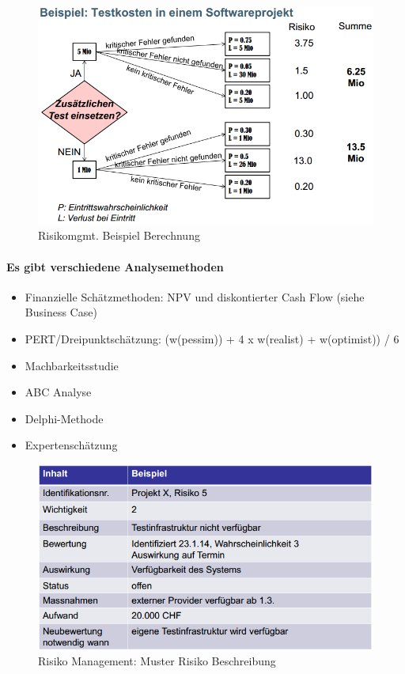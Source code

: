 \begin{figure}[h!]
\centering
\includegraphics[width=0.7\linewidth]{fig/risiko-management-beispiel-berechnung}
\caption{Risikomgmt. Beispiel Berechnung}
\label{fig:risiko-management-beispiel-berechnung}
\end{figure}

\paragraph{Es gibt verschiedene Analysemethoden}
\begin{itemize}
	\item Finanzielle Schätzmethoden: NPV und diskontierter Cash Flow (siehe Business Case)
	\item PERT/Dreipunktschätzung: (w(pessim)) + 4 x w(realist) + w(optimist)) / 6
	\item Machbarkeitsstudie
	\item ABC Analyse
	\item Delphi-Methode
	\item Expertenschätzung
\end{itemize}

\begin{figure}[h!]
\centering
\includegraphics[width=0.8\linewidth]{fig/risiko-management-muster-risiko-beschreibung}
\caption{Risiko Management: Muster Risiko Beschreibung}
\label{fig:risiko-management-muster-risiko-beschreibung}
\end{figure}

